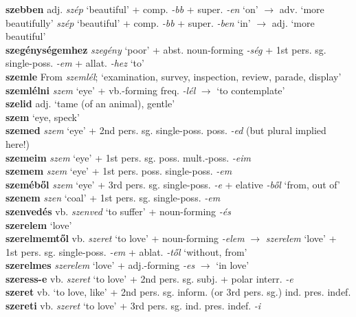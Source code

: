 \documentclass[11pt]{article}
\begin{document}
\textbf{szebben} adj. \emph{szép} `beautiful' + comp. \emph{-bb} +
super. \emph{-en} `on' $\rightarrow$ adv. `more
beautifully' \textbar\textbar{} \emph{szép} `beautiful' +
comp. \emph{-bb} + super. \emph{-ben} `in' $\rightarrow$ adj. `more
beautiful' \\
\textbf{szegénységemhez} \emph{szegény} `poor' +
abst. noun\hyp{}forming \emph{-ség} + 1st pers. sg. single\hyp{}poss. \emph{-em} +
allat. \emph{-hez} `to' \\
\textbf{szemle} From \emph{szemlél}; `examination, survey,
inspection, review, parade, display' \\
\textbf{szemlélni} \emph{szem} `eye' + vb.\hyp{}forming
freq. \emph{-lél} $\rightarrow$ `to contemplate' \\
\textbf{szelid} adj. `tame (of an animal), gentle' \\
\textbf{szem} `eye, speck' \\
\textbf{szemed} \emph{szem} `eye' + 2nd
pers. sg. single\hyp{}poss. poss. \emph{-ed} (but plural implied
here!) \\
\textbf{szemeim} \emph{szem} `eye' + 1st
pers. sg. poss. mult.\hyp{}poss. \emph{-eim} \\
\textbf{szemem} \emph{szem} `eye' + 1st
pers. poss. single\hyp{}poss. \emph{-em} \\
\textbf{szeméből} \emph{szem} `eye' + 3rd
pers. sg. single\hyp{}poss. \emph{-e} + elative \emph{-ből} `from, out
of' \\
\textbf{szenem} \emph{szen} `coal' + 1st pers. sg. single\hyp{}poss. \emph{-em} \\
\textbf{szenvedés} vb. \emph{szenved} `to suffer' +
noun\hyp{}forming \emph{-és} \\
\textbf{szerelem} `love' \\
\textbf{szerelmemtől} vb. \emph{szeret} `to love' +
noun\hyp{}forming \emph{-elem} $\rightarrow$ \emph{szerelem} `love' +
1st pers. sg. single\hyp{}poss. \emph{-em} + ablat. \emph{-től}
`without, from' \\
\textbf{szerelmes} \emph{szerelem} `love' +
adj.\hyp{}forming \emph{-es} $\rightarrow$ `in love' \\
\textbf{szeress-e} vb. \emph{szeret} `to love' + 2nd pers. sg. subj. +
polar interr. \emph{-e} \\
\textbf{szeret} vb. `to love, like' + 2nd
pers. sg. inform. (or 3rd pers. sg.) ind. pres. indef. \\
\textbf{szereti} vb. \emph{szeret} `to love' + 3rd
pers. sg. ind. pres. indef. \emph{-i} \\
\end{document}
